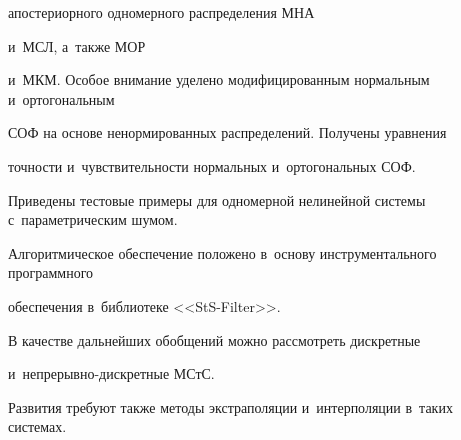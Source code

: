 апостериорного одномерного распределения МНА

и~МСЛ, а~также МОР

и~МКМ. Особое внимание уделено модифицированным нормальным и~ортогональным 

СОФ  на основе ненормированных распределений. Получены уравнения 

точ\-ности и~чувствительности нормальных и~ортогональных СОФ. 

Приведены тестовые примеры для одномерной нелинейной системы с~параметрическим шумом.

Алгоритмическое обеспечение положено в~основу инструментального программного 

обеспечения в~библиотеке <<StS-Filter>>.



В качестве дальнейших обобщений можно рассмотреть дискретные 

и~непрерывно-дискретные МСтС.  

Развития требуют также методы экстраполяции и~интерполяции в~таких системах.



\vspace*{-6pt}



